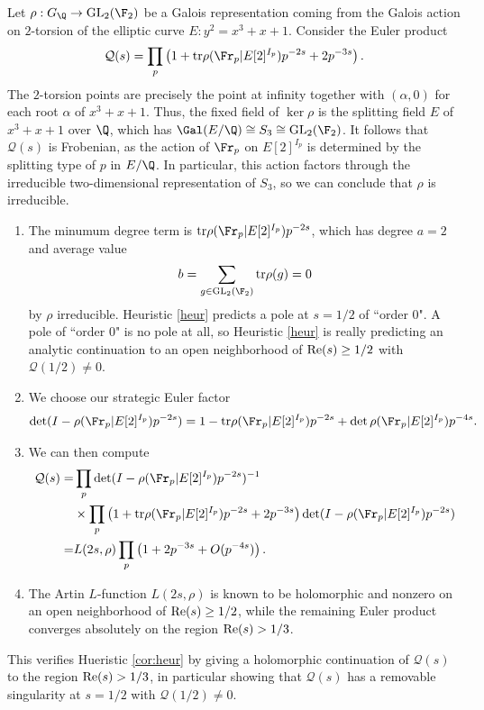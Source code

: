 \documentclass[12pt]{amsart}
\newenvironment{BOXexample}{
\begin{exbox}\mbox{}
\begin{example}
}
{
\end{example}
\end{exbox}
}
\theoremstyle{plain}
\begin{document}
\begin{BOXexample}
    Let $\rho:G_\Q \to {\rm GL}_2(\F_2)$ be a Galois representation coming from the Galois action on $2$-torsion of the elliptic curve $E:y^2 = x^3 + x + 1$. Consider the Euler product
    \[
    \mathcal{Q}(s) = \prod_p \left(1 + {\rm tr}\rho(\Fr_p|E[2]^{I_p})p^{-2s} + 2p^{-3s}\right).
    \]
    The $2$-torsion points are precisely the point at infinity together with $(\alpha,0)$ for each root $\alpha$ of $x^3 + x + 1$. Thus, the fixed field of $\ker\rho$ is the splitting field $E$ of $x^3+x+1$ over $\Q$, which has $\Gal(E/\Q)\cong S_3 \cong {\rm GL}_2(\F_2)$. It follows that $\mathcal{Q}(s)$ is Frobenian, as the action of $\Fr_p$ on $E[2]^{I_p}$ is determined by the splitting type of $p$ in $E/\Q$. In particular, this action factors through the irreducible two-dimensional representation of $S_3$, so we can conclude that $\rho$ is irreducible.

    \begin{enumerate}[(1)]
        \item The minumum degree term is ${\rm tr}\rho(\Fr_p|E[2]^{I_p}) p^{-2s}$, which has degree $a=2$ and average value
        \[
            b = \sum_{g\in {\rm GL_2(\F_2)}} {\rm tr}\rho(g) = 0
        \]
        by $\rho$ irreducible. Heuristic \ref{heur} predicts a pole at $s=1/2$ of ``order $0$". A pole of ``order $0$" is no pole at all, so Heuristic \ref{heur} is really predicting an analytic continuation to an open neighborhood of ${\rm Re}(s) \ge 1/2$ with $\mathcal{Q}(1/2)\ne 0$.

        \item We choose our strategic Euler factor
        \[
        \det(I - \rho(\Fr_p|E[2]^{I_p}) p^{-2s}) = 1 - {\rm tr}\rho(\Fr_p|E[2]^{I_p}) p^{-2s} + \det\rho(\Fr_p|E[2]^{I_p})p^{-4s}.
        \]
        \item We can then compute
        \begin{align*}
            \mathcal{Q}(s) =& \prod_p \det(I - \rho(\Fr_p|E[2]^{I_p}) p^{-2s})^{-1}\\
            &\times \prod_p\left(1 + {\rm tr}\rho(\Fr_p|E[2]^{I_p})p^{-2s} + 2p^{-3s}\right)\det(I - \rho(\Fr_p|E[2]^{I_p}) p^{-2s})\\
            =& L(2s,\rho)\prod_p\left(1 + 2p^{-3s} +O(p^{-4s})\right).
        \end{align*}
        \item The Artin $L$-function $L(2s,\rho)$ is known to be holomorphic and nonzero on an open neighborhood of ${\rm Re}(s)\ge 1/2$, while the remaining Euler product converges absolutely on the region ${\rm Re}(s) > 1/3$.
    \end{enumerate}
    This verifies Hueristic \ref{cor:heur} by giving a holomorphic continuation of $\mathcal{Q}(s)$ to the region ${\rm Re}(s) > 1/3$, in particular showing that $\mathcal{Q}(s)$ has a removable singularity at $s=1/2$ with $\mathcal{Q}(1/2)\ne 0$.
\end{BOXexample}
\end{document}
